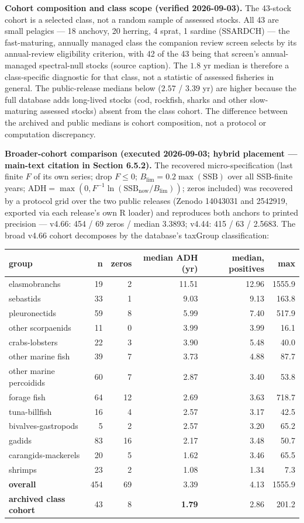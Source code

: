 \documentclass[11pt]{article}
\begin{document}
\textbf{Cohort composition and class scope (verified 2026-09-03).} The 43-stock cohort is a selected class, not a random sample of assessed stocks. All 43 are small pelagics --- 18 anchovy, 20 herring, 4 sprat, 1 sardine (SSARDCH) --- the fast-maturing, annually managed class the companion review screen selects by its annual-review eligibility criterion, with 42 of the 43 being that screen's annual-managed spectral-null stocks (source caption). The \(1.8\) yr median is therefore a class-specific diagnostic for that class, not a statistic of assessed fisheries in general. The public-release medians below (\(2.57\) / \(3.39\) yr) are higher because the full database adds long-lived stocks (cod, rockfish, sharks and other slow-maturing assessed stocks) absent from the class cohort. The difference between the archived and public medians is cohort composition, not a protocol or computation discrepancy.

\textbf{Broader-cohort comparison (executed 2026-09-03; hybrid placement --- main-text citation in Section 6.5.2).} The recovered micro-specification (last finite \(F\) of its own series; drop \(F \le 0\); \(B_{\lim} = 0.2\max(\mathrm{SSB})\) over all SSB-finite years; \(\mathrm{ADH} = \max(0, F^{-1}\ln(\mathrm{SSB}_{\mathrm{now}}/B_{\lim}))\); zeros included) was recovered by a protocol grid over the two public releases (Zenodo 14043031 and 2542919, exported via each release's own R loader) and reproduces both anchors to printed precision --- v4.66: 454 / 69 zeros / median 3.3893; v4.44: 415 / 63 / 2.5683. The broad v4.66 cohort decomposes by the database's taxGroup classification:

\begin{longtable}{@{}l|r|r|r|r|r@{}}
\toprule
group & n & zeros & median ADH (yr) & median, positives & max \\
\midrule
elasmobranchs & 19 & 2 & 11.51 & 12.96 & 1555.9 \\
sebastids & 33 & 1 & 9.03 & 9.13 & 163.8 \\
pleuronectids & 59 & 8 & 5.99 & 7.40 & 517.9 \\
other scorpaenids & 11 & 0 & 3.99 & 3.99 & 16.1 \\
crabs-lobsters & 22 & 3 & 3.90 & 5.48 & 40.0 \\
other marine fish & 39 & 7 & 3.73 & 4.88 & 87.7 \\
other marine percoidids & 60 & 7 & 2.87 & 3.40 & 53.8 \\
forage fish & 64 & 12 & 2.69 & 3.63 & 718.7 \\
tuna-billfish & 16 & 4 & 2.57 & 3.17 & 42.5 \\
bivalves-gastropods & 5 & 2 & 2.57 & 3.20 & 65.2 \\
gadids & 83 & 16 & 2.17 & 3.48 & 50.7 \\
carangids-mackerels & 20 & 5 & 1.62 & 3.46 & 65.5 \\
shrimps & 23 & 2 & 1.08 & 1.34 & 7.3 \\
\textbf{overall} & 454 & 69 & 3.39 & 4.13 & 1555.9 \\
\textbf{archived class cohort} & 43 & 8 & \textbf{1.79} & 2.86 & 201.2 \\
\bottomrule
\end{longtable}
\end{document}
